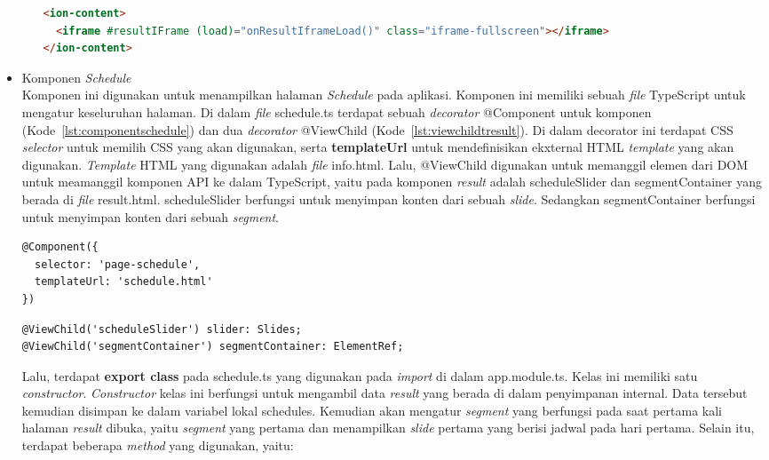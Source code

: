 \begin{itemize}
\begin{itemize}
\begin{lstlisting}[language=html, label={lst:contentResult}, caption=\textit{Content} pada result.html]
<ion-content>
  <iframe #resultIFrame (load)="onResultIframeLoad()" class="iframe-fullscreen"></iframe>
</ion-content>
\end{lstlisting} 
	\end{itemize}
	
	\item Komponen \textit{Schedule}\\ 
	Komponen ini digunakan untuk menampilkan halaman \textit{Schedule} pada aplikasi. Komponen ini memiliki sebuah \textit{file} TypeScript untuk mengatur keseluruhan halaman. Di dalam \textit{file} schedule.ts terdapat sebuah \textit{decorator} @Component untuk komponen (Kode~\ref{lst:componentschedule}) dan dua \textit{decorator} @ViewChild (Kode~\ref{lst:viewchildtresult}). Di dalam decorator ini terdapat CSS \textit{selector} untuk memilih CSS yang akan digunakan, serta \textbf{templateUrl} untuk mendefinisikan ekxternal HTML \textit{template} yang akan digunakan. \textit{Template} HTML yang digunakan adalah \textit{file} info.html. Lalu, @ViewChild digunakan untuk memanggil elemen dari DOM untuk meamanggil komponen API ke dalam TypeScript, yaitu pada komponen \textit{result} adalah scheduleSlider dan segmentContainer yang berada di \textit{file} result.html. scheduleSlider berfungsi untuk menyimpan konten dari sebuah \textit{slide}. Sedangkan segmentContainer berfungsi untuk menyimpan konten dari sebuah \textit{segment}.
	
\begin{lstlisting}[language=html, label={lst:componentschedule}, caption=@Component pada schedule.ts]
@Component({
  selector: 'page-schedule',
  templateUrl: 'schedule.html'
})
\end{lstlisting}

\begin{lstlisting}[language=html, label={lst:viewchildtresult}, caption=@ViewChild pada schedule.ts]
@ViewChild('scheduleSlider') slider: Slides;
@ViewChild('segmentContainer') segmentContainer: ElementRef;
\end{lstlisting} 

	Lalu, terdapat \textbf{export class} pada schedule.ts yang digunakan pada \textit{import} di dalam app.module.ts. Kelas ini memiliki satu \textit{constructor}. \textit{Constructor} kelas ini berfungsi untuk mengambil data \textit{result} yang berada di dalam penyimpanan internal. Data tersebut kemudian disimpan ke dalam variabel lokal schedules. Kemudian akan mengatur \textit{segment} yang berfungsi pada saat pertama kali halaman \textit{result} dibuka, yaitu \textit{segment} yang pertama dan menampilkan \textit{slide} pertama yang berisi jadwal pada hari pertama. Selain itu, terdapat beberapa \textit{method} yang digunakan, yaitu:
	

\end{itemize}
